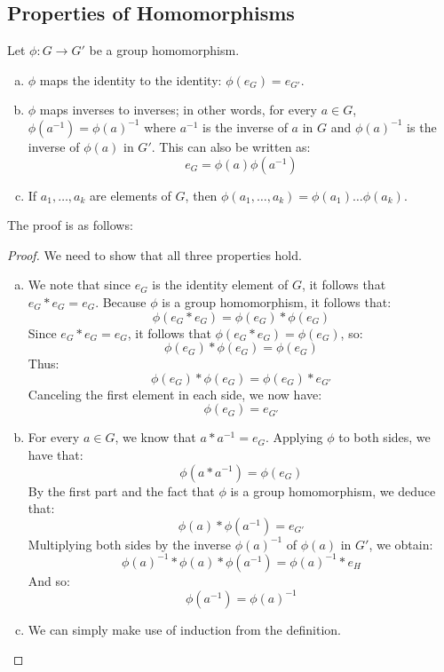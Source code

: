 \documentclass[letterpaper]{article}
\begin{document}
\subsection{Properties of Homomorphisms}
\begin{mdframed}
    \begin{proposition}
        Let $\phi: G \to G'$ be a group homomorphism. 
        \begin{enumerate}[(a)]
            \item $\phi$ maps the identity to the identity: $\phi(e_G) = e_{G'}$. 
            \item $\phi$ maps inverses to inverses; in other words, for every $a \in G$, $\phi(a^{-1}) = \phi(a)^{-1}$ where $a^{-1}$ is the inverse of $a$ in $G$ and $\phi(a)^{-1}$ is the inverse of $\phi(a)$ in $G'$. This can also be written as: 
            \[e_G = \phi(a) \phi(a^{-1})\]
            \item If $a_1, \dots, a_k$ are elements of $G$, then $\phi(a_1, \dots, a_k) = \phi(a_1) \dots \phi(a_k)$. 
        \end{enumerate}
    \end{proposition}
\end{mdframed}

The proof is as follows: 
\begin{mdframed}
    \begin{proof}
        We need to show that all three properties hold. 
        \begin{enumerate}[(a)]
            \item We note that since $e_G$ is the identity element of $G$, it follows that $e_G * e_G = e_G$. Because $\phi$ is a group homomorphism, it follows that: 
            \[\boxed{\phi(e_G * e_G)} = \phi(e_G) * \phi(e_G)\]
            Since $e_G * e_G = e_G$, it follows that $\phi(e_G * e_G) = \phi(e_G)$, so: 
            \[\phi(e_G) * \phi(e_G) = \boxed{\phi(e_G)}\]
            Thus: 
            \[\phi(e_G) * \phi(e_G) = \phi(e_G) * e_{G'}\]
            Canceling the first element in each side, we now have: 
            \[\phi(e_G) = e_{G'}\]

            \item For every $a \in G$, we know that $a * a^{-1} = e_G$. Applying $\phi$ to both sides, we have that: 
            \[\phi(a * a^{-1}) = \phi(e_G)\]
            By the first part and the fact that $\phi$ is a group homomorphism, we deduce that: 
            \[\phi(a) * \phi(a^{-1}) = e_{G'}\]
            Multiplying both sides by the inverse $\phi(a)^{-1}$ of $\phi(a)$ in $G'$, we obtain: 
            \[\phi(a)^{-1} * \phi(a) * \phi(a^{-1}) = \phi(a)^{-1} * e_H\]
            And so:
            \[\phi(a^{-1}) = \phi(a)^{-1}\]

            \item We can simply make use of induction from the definition. \qedhere
        \end{enumerate}
    \end{proof}
\end{mdframed}
\end{document}
